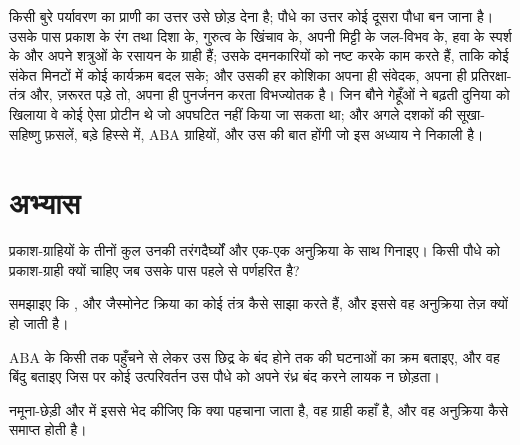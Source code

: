 \begin{remark}\label{rem:b3:plant-molecular-physiology:remark}
किसी बुरे पर्यावरण का प्राणी का उत्तर उसे छोड़ देना है; पौधे का उत्तर
कोई दूसरा पौधा बन जाना है। उसके पास प्रकाश के रंग तथा दिशा के, गुरुत्व
के खिंचाव के, अपनी मिट्टी के जल-विभव के, हवा के स्पर्श के और अपने
शत्रुओं के रसायन के ग्राही हैं; उसके  दमनकारियों को नष्ट करके
काम करते हैं, ताकि कोई संकेत मिनटों में कोई कार्यक्रम बदल सके; और उसकी
हर कोशिका अपना ही संवेदक, अपना ही प्रतिरक्षा-तंत्र और, ज़रूरत पड़े तो,
अपना ही पुनर्जनन करता विभज्योतक है। जिन बौने गेहूँओं ने बढ़ती दुनिया
को खिलाया वे कोई ऐसा  प्रोटीन थे जो अपघटित नहीं किया जा सकता था;
और अगले दशकों की सूखा-सहिष्णु फ़सलें, बड़े हिस्से में, ABA ग्राहियों,
 और उस  की बात होंगी जो इस अध्याय ने
निकाली है।
\end{remark}

\section{अभ्यास}

\begin{exercise}[$\star$]\label{exo:b3:plant-molecular-physiology:1}
प्रकाश-ग्राहियों के तीनों कुल उनकी तरंगदैर्घ्यों और एक-एक अनुक्रिया के
साथ गिनाइए। किसी पौधे को प्रकाश-ग्राही क्यों चाहिए जब उसके पास पहले से
पर्णहरित है?
\end{exercise}

\begin{exercise}[$\star$]\label{exo:b3:plant-molecular-physiology:2}
समझाइए कि ,  और जैस्मोनेट क्रिया का कोई तंत्र कैसे साझा
करते हैं, और इससे वह अनुक्रिया तेज़ क्यों हो जाती है।
\end{exercise}

\begin{exercise}[$\star$]\label{exo:b3:plant-molecular-physiology:3}
ABA के किसी  तक पहुँचने से लेकर उस छिद्र के बंद होने तक की
घटनाओं का क्रम बताइए, और वह बिंदु बताइए जिस पर कोई उत्परिवर्तन उस पौधे
को अपने रंध्र बंद करने लायक न छोड़ता।
\end{exercise}

\begin{exercise}[$\star$]\label{exo:b3:plant-molecular-physiology:4}
नमूना-छेड़ी और  में इससे भेद कीजिए कि क्या पहचाना
जाता है, वह ग्राही कहाँ है, और वह अनुक्रिया कैसे समाप्त होती है।
\end{exercise}

